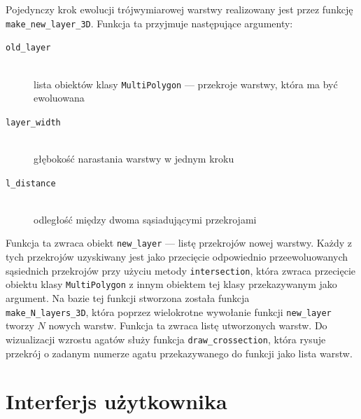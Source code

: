 \documentclass{article}
\begin{document}
Pojedynczy krok ewolucji trójwymiarowej warstwy realizowany jest przez funkcję \texttt{make\_new\_layer\_3D}. Funkcja ta przyjmuje następujące argumenty:
\begin{description}
\item[\texttt{old\_layer}] \hfill \\
lista obiektów klasy \texttt{MultiPolygon} --- przekroje warstwy, która ma być ewoluowana
\item[\texttt{layer\_width}] \hfill \\
głębokość narastania warstwy w jednym kroku
\item[\texttt{l\_distance}] \hfill \\
odległość między dwoma sąsiadującymi przekrojami
\end{description}
Funkcja ta zwraca obiekt \texttt{new\_layer} --- listę przekrojów nowej warstwy. Każdy z tych przekrojów uzyskiwany jest jako przecięcie odpowiednio przeewoluowanych sąsiednich przekrojów przy użyciu metody \texttt{intersection}, która zwraca przecięcie obiektu klasy \texttt{MultiPolygon} z innym obiektem tej klasy przekazywanym jako argument. Na bazie tej funkcji stworzona została funkcja\\
\texttt{make\_N\_layers\_3D}, która poprzez wielokrotne wywołanie funkcji \texttt{new\_layer} tworzy $N$ nowych warstw. Funkcja ta zwraca listę utworzonych warstw. Do wizualizacji wzrostu agatów służy funkcja \texttt{draw\_crossection}, która rysuje przekrój o zadanym numerze agatu przekazywanego do funkcji jako lista warstw.
\section{Interferjs użytkownika}
\end{document}
